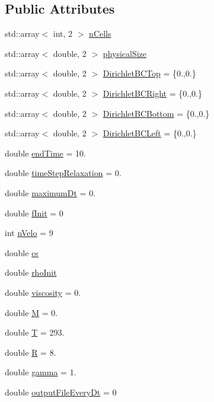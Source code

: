 \subsection*{Public Attributes}
\begin{DoxyCompactItemize}
\item 
std\+::array$<$ int, 2 $>$ \mbox{\hyperlink{structSettings_a43a0d2ee903496bfb86693a43a891a69}{n\+Cells}}
\item 
std\+::array$<$ double, 2 $>$ \mbox{\hyperlink{structSettings_a372a1549c306b12ca7bb0ed84f8a4cef}{physical\+Size}}
\item 
std\+::array$<$ double, 2 $>$ \mbox{\hyperlink{structSettings_a3bc8ca94bfe51363a76e9f974b3863f4}{Dirichlet\+B\+C\+Top}} = \{0.,0.\}
\item 
std\+::array$<$ double, 2 $>$ \mbox{\hyperlink{structSettings_af4eaa0cd4601394a6d5c6cbc938c2714}{Dirichlet\+B\+C\+Right}} = \{0.,0.\}
\item 
std\+::array$<$ double, 2 $>$ \mbox{\hyperlink{structSettings_aa04d7a368baf246849f0c65882900177}{Dirichlet\+B\+C\+Bottom}} = \{0.,0.\}
\item 
std\+::array$<$ double, 2 $>$ \mbox{\hyperlink{structSettings_aaf2f9565c1f20214e240af235ecbc9ef}{Dirichlet\+B\+C\+Left}} = \{0.,0.\}
\item 
double \mbox{\hyperlink{structSettings_a73cd9110793ede99e9ebe409e5e115fd}{end\+Time}} = 10.
\item 
double \mbox{\hyperlink{structSettings_ab186bb6f0f6ce1f234e5ab5a221c838d}{time\+Step\+Relaxation}} = 0.
\item 
double \mbox{\hyperlink{structSettings_a988b93fdeb6c91932043b3f746b45e86}{maximum\+Dt}} = 0.
\item 
double \mbox{\hyperlink{structSettings_a36c93b408af73ebd4a00509a8d5c3b54}{f\+Init}} = 0
\item 
int \mbox{\hyperlink{structSettings_aefbc364c73123eacd4904e6429729013}{n\+Velo}} = 9
\item 
double \mbox{\hyperlink{structSettings_ada065d4ba81dd3d37f1c91267b631f30}{cs}}
\item 
double \mbox{\hyperlink{structSettings_aaf6b6f469c3ba50604e75845f1aa3b2a}{rho\+Init}}
\item 
double \mbox{\hyperlink{structSettings_a96d99822c1bf7f6b025c93546c1c2a3a}{viscosity}} = 0.
\item 
double \mbox{\hyperlink{structSettings_a36ab17aa9afc92ec22ac23f453572e57}{M}} = 0.
\item 
double \mbox{\hyperlink{structSettings_a255c7c5f048ccaeb00206462d3530240}{T}} = 293.
\item 
double \mbox{\hyperlink{structSettings_ad23422f52cc720203901b5d03605070b}{R}} = 8.
\item 
double \mbox{\hyperlink{structSettings_a626bd5aa12e49526b8a87ae6df5db79c}{gamma}} = 1.
\item 
double \mbox{\hyperlink{structSettings_a0e6a7871fa07786983bfcd08835122a0}{output\+File\+Every\+Dt}} = 0
\end{DoxyCompactItemize}


